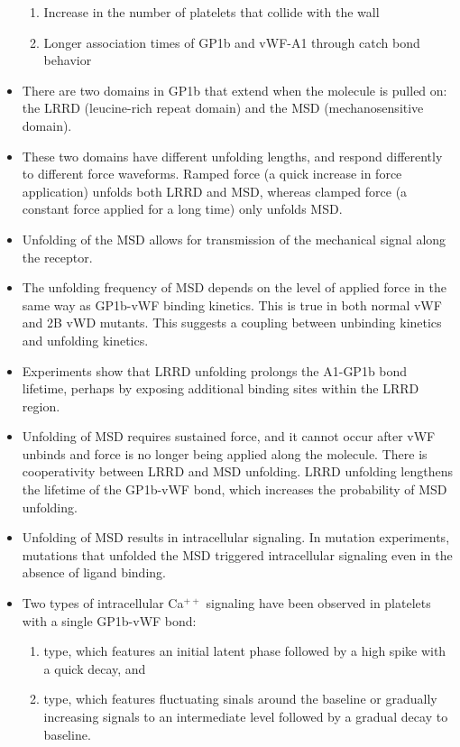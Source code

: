 \documentclass[
10pt, %
letterpaper, %
twocolumn, %
landscape %
]{article}
\newcommand{\inta}[1]{\textalpha\textsubscript{#1}}
\newcommand{\intb}[1]{\textbeta\textsubscript{#1}}
\begin{document}
\begin{itemize}
\begin{enumerate}
  \item Increase in the number of platelets that collide with the wall
  \item Longer association times of GP1b and vWF-A1 through catch bond
    behavior
  \end{enumerate}
\item There are two domains in GP1b that extend when the molecule is
  pulled on: the LRRD (leucine-rich repeat domain) and the MSD
  (mechanosensitive domain).
\item These two domains have different unfolding lengths, and respond
  differently to different force waveforms. Ramped force (a quick
  increase in force application) unfolds both LRRD and MSD, whereas
  clamped force (a constant force applied for a long time) only
  unfolds MSD.
\item Unfolding of the MSD allows for transmission of the mechanical
  signal along the receptor. 
\item The unfolding frequency of MSD depends on the level of applied
  force in the same way as GP1b-vWF binding kinetics. This is true in
  both normal vWF and 2B vWD mutants. This suggests a coupling between
  unbinding kinetics and unfolding kinetics.
\item Experiments show that LRRD unfolding prolongs the A1-GP1b bond
  lifetime, perhaps by exposing additional binding sites within the
  LRRD region. 
\item Unfolding of MSD requires sustained force, and it cannot occur
  after vWF unbinds and force is no longer being applied along the
  molecule. There is cooperativity between LRRD and MSD
  unfolding. LRRD unfolding lengthens the lifetime of the GP1b-vWF
  bond, which increases the probability of MSD unfolding.
\item Unfolding of MSD results in intracellular signaling. In mutation
  experiments, mutations that unfolded the MSD triggered intracellular
  signaling even in the absence of ligand binding.
\item Two types of intracellular Ca$^{++}$ signaling have been
  observed in platelets with a single GP1b-vWF bond:
  \begin{enumerate}
  \item \inta{} type, which features an initial latent phase followed
    by a high spike with a quick decay, and 
  \item \intb{} type, which features fluctuating sinals around the
    baseline or gradually increasing signals to an intermediate level
    followed by a gradual decay to baseline. 

\end{enumerate}
\end{itemize}
\end{document}
